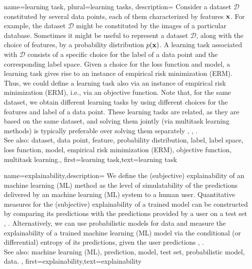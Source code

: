 {name={learning task}, plural={learning tasks}, description=
	{Consider a dataset $\mathcal{D}$ constituted by several data points, each of them 
	 characterized by features ${\bf x}$. For example, the dataset $\mathcal{D}$ 
	 might be constituted by the images of a particular database. Sometimes it might be useful 
	 to represent a dataset $\mathcal{D}$, along with the choice of features, by a probability distribution $p({\bf x})$. 
	 A learning task associated with $\mathcal{D}$ consists of a specific 
	 choice for the label of a data point and the corresponding label space. 
	 Given a choice for the loss function and model, a learning task gives rise to an 
	 instance of empirical risk minimization (ERM). Thus, we could define a learning task also via an instance of empirical risk minimization (ERM), i.e., 
	 via an objective function. Note that, for the same dataset, we obtain different learning tasks by using 
	 different choices for the features and label of a data point. These learning 
	 tasks are related, as they are based on the same dataset, and solving them jointly 
	 (via multitask learning methods) is typically preferable over solving them separately \cite{Caruana:1997wk}, \cite{JungGaphLassoSPL}, \cite{CSGraphSelJournal}.
	 			\\ 
		See also: dataset, data point, feature, probability distribution, label, label space, loss function, model, empirical risk minimization (ERM), objective function, multitask learning.},
	first={learning task},text={learning task}
}

{name={explainability},description=
		{We define the (subjective) explainability of an machine learning (ML) method 
			as the level of simulatability \cite{Colin:2022aa} of the predictions 
			delivered by an machine learning (ML) system to a human user. Quantitative measures for the 
			(subjective) explainability of a trained model can be constructed by 
			comparing its predictions with the predictions provided by a user 
			on a test set \cite{Colin:2022aa}, \cite{Zhang:2024aa}. Alternatively, we can use 
			probabilistic models for data and measure the explainability of a trained machine learning (ML) 
			model via the conditional (or differential) entropy of its predictions, given the user predictions \cite{JunXML2020}, \cite{Chen2018}.
						\\ 
		See also: machine learning (ML), prediction, model, test set, probabilistic model, data.
		},
		first={explainability},text={explainability}
	}

